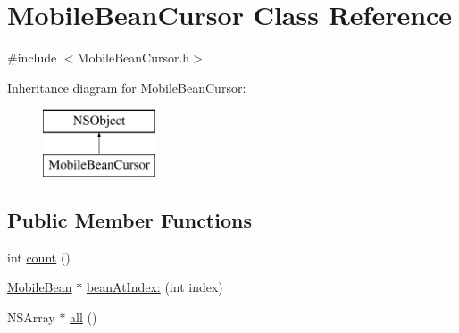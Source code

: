 \hypertarget{interface_mobile_bean_cursor}{
\section{\-Mobile\-Bean\-Cursor \-Class \-Reference}
\label{interface_mobile_bean_cursor}
}


{\ttfamily \#include $<$\-Mobile\-Bean\-Cursor.\-h$>$}

\-Inheritance diagram for \-Mobile\-Bean\-Cursor\-:\begin{figure}[H]
\begin{center}
\leavevmode
\includegraphics[height=2.000000cm]{interface_mobile_bean_cursor}
\end{center}
\end{figure}
\subsection*{\-Public \-Member \-Functions}
\begin{DoxyCompactItemize}
\item 
int \hyperlink{interface_mobile_bean_cursor_a9783023b782efa5e966b04e74ff264d0}{count} ()
\item 
\hyperlink{interface_mobile_bean}{\-Mobile\-Bean} $\ast$ \hyperlink{interface_mobile_bean_cursor_aaa6fce80414c8811140613b436b5c856}{bean\-At\-Index\-:} (int index)
\item 
\-N\-S\-Array $\ast$ \hyperlink{interface_mobile_bean_cursor_a7b4f5eda9d1d51af1afd8fb86f9b2698}{all} ()
\end{DoxyCompactItemize}
